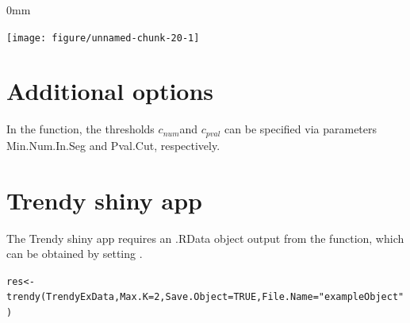 \documentclass{article}\usepackage[]{graphicx}\usepackage[usenames,dvipsnames]{color}
\newcommand{\hlnum}[1]{\textcolor[rgb]{0.816,0.125,0.439}{#1}}%
\newcommand{\hlstr}[1]{\textcolor[rgb]{0.251,0.627,0.251}{#1}}%
\newcommand{\hlcom}[1]{\textcolor[rgb]{0.502,0.502,0.502}{\textit{#1}}}%
\newcommand{\hlopt}[1]{\textcolor[rgb]{0,0,0}{#1}}%
\newcommand{\hlstd}[1]{\textcolor[rgb]{0.251,0.251,0.251}{#1}}%
\newcommand{\hlkwb}[1]{\textcolor[rgb]{0,0,0}{#1}}%
\newcommand{\hlkwc}[1]{\textcolor[rgb]{0.251,0.251,0.251}{#1}}%
\newcommand{\hlkwd}[1]{\textcolor[rgb]{0.878,0.439,0.125}{#1}}%
\newenvironment{knitrout}{}{} %
\begin{document}
\begin{knitrout}
\color{fgcolor}\begin{adjustwidth}{\fltoffset}{0mm}

{\centering \texttt{[image: figure/unnamed-chunk-20-1]} 

}

\end{adjustwidth}
\end{knitrout}


\section{Additional options}
In the  function,
the thresholds $c_{num}$and  $c_{pval}$
can be specified via parameters
Min.Num.In.Seg and Pval.Cut, respectively.

\section{Trendy shiny app}

The Trendy shiny app requires an .RData object output from the  function, which can be obtained by setting .

\begin{knitrout}
\color{fgcolor}\begin{kframe}
\begin{alltt}
\hlstd{res} \hlkwb{<-} \hlkwd{trendy}\hlstd{(TrendyExData,} \hlkwc{Max.K}\hlstd{=}\hlnum{2}\hlstd{,} \hlkwc{Save.Object} \hlstd{=} \hlnum{TRUE}\hlstd{,} \hlkwc{File.Name}\hlstd{=}\hlstr{"exampleObject"}\hlstd{)}
\end{alltt}
\end{kframe}
\end{knitrout}
\end{document}
